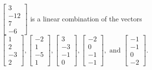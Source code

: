 \begin{exercise}
\begin{exerciseStatement}
  \end{exerciseStatement}
  \begin{exerciseAnswer}
   \(\left[\begin{array}{c}
3 \\
-12 \\
7 \\
-6
\end{array}\right]\) 
  	 is  
	a linear combination of the vectors \(\left[\begin{array}{c}
1 \\
2 \\
-3 \\
2
\end{array}\right] , \left[\begin{array}{c}
-2 \\
1 \\
-5 \\
1
\end{array}\right] , \left[\begin{array}{c}
3 \\
-3 \\
-1 \\
0
\end{array}\right] , \left[\begin{array}{c}
-2 \\
0 \\
-1 \\
-1
\end{array}\right] , \text{ and } \left[\begin{array}{c}
-1 \\
-1 \\
0 \\
-2
\end{array}\right]\).

	
  


  \end{exerciseAnswer}
\end{exercise}